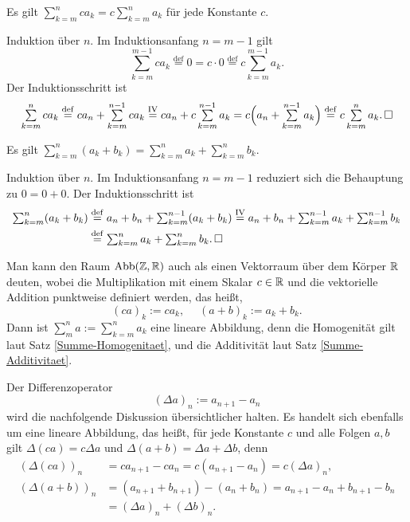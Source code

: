 \begin{Satz}\label{Summe-Homogenitaet}
Es gilt $\sum_{k=m}^n ca_k = c\sum_{k=m}^n a_k$ für jede Konstante $c$.
\end{Satz}
\begin{Beweis}
Induktion über $n$. Im Induktionsanfang $n=m-1$ gilt
\[\textstyle\sum\limits_{k=m}^{m-1} ca_k \stackrel{\mathrm{def}}= 0 = c\cdot 0
\stackrel{\mathrm{def}}= c\sum\limits_{k=m}^{m-1} a_k.\]
Der Induktionsschritt ist
\[\textstyle\sum\limits_{k=m}^n ca_k \stackrel{\mathrm{def}}= ca_n+\sum\limits_{k=m}^{n-1} ca_k
\stackrel{\mathrm{IV}}= ca_n + c\sum\limits_{k=m}^{n-1} a_k
= c\Big(a_n + \sum\limits_{k=m}^{n-1} a_k\Big) \stackrel{\mathrm{def}}= c\sum\limits_{k=m}^n a_k.\,\Box\]
\end{Beweis}

\begin{Satz}\label{Summe-Additivitaet}
Es gilt $\sum_{k=m}^n (a_k+b_k) = \sum_{k=m}^n a_k + \sum_{k=m}^n b_k$.
\end{Satz}
\begin{Beweis}
Induktion über $n$. Im Induktionsanfang $n=m-1$ reduziert sich die
Behauptung zu $0 = 0 + 0$. Der Induktionsschritt ist%
\begin{align*}
\textstyle\sum_{k=m}^n (a_k + b_k) &\textstyle\stackrel{\mathrm{def}}=
a_n + b_n + \sum_{k=m}^{n-1} (a_k + b_k)
\stackrel{\mathrm{IV}}=
a_n + b_n + \sum_{k=m}^{n-1} a_k + \sum_{k=m}^{n-1} b_k\\
&\textstyle\stackrel{\mathrm{def}}= \sum_{k=m}^n a_k + \sum_{k=m}^n b_k.\,\Box
\end{align*}
\end{Beweis}
Man kann den Raum $\operatorname{Abb}(\mathbb Z,\mathbb R)$ auch als einen Vektorraum über dem Körper
$\mathbb R$ deuten, wobei die Multiplikation mit einem Skalar $c\in\mathbb R$ und die
vektorielle Addition punktweise definiert werden, das heißt,%
\[(ca)_k := ca_k,\quad\; (a+b)_k := a_k+b_k.\]
Dann ist $\sum_m^n a := \sum_{k=m}^n a_k$ eine lineare Abbildung,
denn die Homogenität gilt laut Satz \ref{Summe-Homogenitaet}, und
die Additivität laut Satz \ref{Summe-Additivitaet}.

Der Differenzoperator
\[(\Delta a)_n := a_{n+1} - a_n\]
wird die nachfolgende Diskussion übersichtlicher halten. Es handelt
sich ebenfalls um eine lineare Abbildung, das heißt, für jede Konstante
$c$ und alle Folgen $a,b$ gilt $\Delta (ca) = c\Delta a$ und
$\Delta(a+b) = \Delta a + \Delta b$, denn%
\begin{align*}
(\Delta (ca))_n &= ca_{n+1} - ca_n = c(a_{n+1}-a_n) = c(\Delta a)_n,\\
(\Delta(a+b))_n &= (a_{n+1}+b_{n+1}) - (a_n + b_n)
= a_{n+1} - a_n + b_{n+1} - b_n\\
&= (\Delta a)_n + (\Delta b)_n.
\end{align*}

